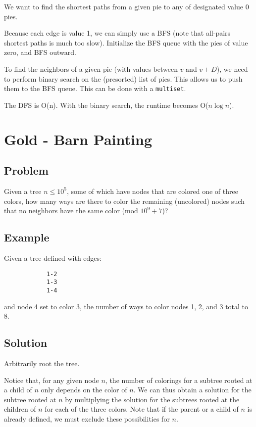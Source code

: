 \documentclass[11pt]{article}
\begin{document}
        We want to find the shortest paths from a given pie to any of designated value 0 pies. 
        
        Because each edge is value 1, we can simply use a BFS (note that all-pairs shortest paths is much too slow). Initialize the BFS queue with the pies of value zero, and BFS outward. 
        
        To find the neighbors of a given pie (with values between $v$ and $v+D$), we need to perform binary search on the (presorted) list of pies. This allows us to push them to the BFS queue. This can be done with a \verb|multiset|.
        
        The DFS is O(n). With the binary search, the runtime becomes O($n \log n$).
        
\section{Gold - Barn Painting}
    \subsection{Problem}
        Given a tree $n \leq 10^5$, some of which have nodes that are colored one of three colors, how many ways are there to color the remaining (uncolored) nodes such that no neighbors have the same color (mod $10^9+7$)?
        
    \subsection{Example}
        Given a tree defined with edges:
        \begin{verbatim}
            1-2
            1-3
            1-4
        \end{verbatim}
        and node 4 set to color 3, the number of ways to color nodes 1, 2, and 3 total to 8.
    
    \subsection{Solution}
        Arbitrarily root the tree. 
        
        Notice that, for any given node $n$, the number of colorings for a subtree rooted at a child of $n$ only depends on the color of $n$. We can thus obtain a solution for the subtree rooted at $n$ by multiplying the solution for the subtrees rooted at the children of $n$ for each of the three colors. Note that if the parent or a child of $n$ is already defined, we must exclude these possibilities for $n$.
        
\end{document}
